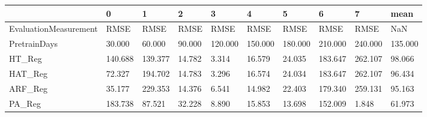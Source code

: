 \begin{tabular}{llllllllll}
\toprule
{} &       0 &       1 &      2 &       3 &       4 &       5 &       6 &       7 &    mean \\
\midrule
EvaluationMeasurement &    RMSE &    RMSE &   RMSE &    RMSE &    RMSE &    RMSE &    RMSE &    RMSE &     NaN \\
PretrainDays          &  30.000 &  60.000 & 90.000 & 120.000 & 150.000 & 180.000 & 210.000 & 240.000 & 135.000 \\
HT\_Reg                & 140.688 & 139.377 & 14.782 &   3.314 &  16.579 &  24.035 & 183.647 & 262.107 &  98.066 \\
HAT\_Reg               &  72.327 & 194.702 & 14.783 &   3.296 &  16.574 &  24.034 & 183.647 & 262.107 &  96.434 \\
ARF\_Reg               &  35.177 & 229.353 & 14.376 &   6.541 &  14.982 &  22.403 & 179.340 & 259.131 &  95.163 \\
PA\_Reg                & 183.738 &  87.521 & 32.228 &   8.890 &  15.853 &  13.698 & 152.009 &   1.848 &  61.973 \\
\bottomrule
\end{tabular}
